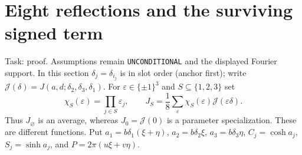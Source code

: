 \documentclass[11pt]{article}
\begin{document}
\section{Eight reflections and the surviving signed term}
Task: proof. Assumptions remain \texttt{UNCONDITIONAL} and the displayed
Fourier support. In this section $\delta_j=\delta_{i_j}$ is in slot order
(anchor first); write $\mathcal J(\delta)=J(a,d;\delta_2,\delta_3,\delta_1)$.
For $\varepsilon\in\{\pm1\}^3$ and $S\subseteq\{1,2,3\}$ set
\[
 \chi_S(\varepsilon)=\prod_{j\in S}\varepsilon_j,\qquad
 J_S=\frac18\sum_\varepsilon\chi_S(\varepsilon)
                          \mathcal J(\varepsilon\delta).
\]
Thus $J_\varnothing$ is an average, whereas $J_0=\mathcal J(0)$
is a parameter specialization. These are different functions.
Put $a_1=b\delta_1(\xi+\eta)$, $a_2=b\delta_2\xi$, $a_3=b\delta_3\eta$,
$C_j=\cosh a_j$, $S_j=\sinh a_j$, and $P=2\pi(u\xi+v\eta)$.
\end{document}
